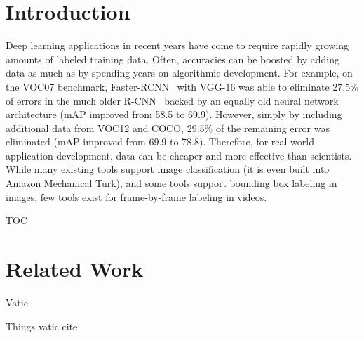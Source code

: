 \section{Introduction}
\label{sec:introduction}

Deep learning applications in recent years have come to require rapidly growing amounts of labeled training data.
Often, accuracies can be boosted by adding data as much as by spending years on algorithmic development.
For example, on the VOC07 benchmark, Faster-RCNN~\cite{FasterRCNN} with VGG-16 was able to eliminate 27.5\% of errors in the much older R-CNN~\cite{RCNN} backed by an equally old neural network architecture (mAP improved from 58.5 to 69.9). 
However, simply by including additional data from VOC12 and COCO, 29.5\% of the remaining error was eliminated (mAP improved from 69.9 to 78.8). 
Therefore, for real-world application development, data can be cheaper and more effective than scientists. 
While many existing tools support image classification (it is even built into Amazon Mechanical Turk), and some tools support bounding box labeling in images, few tools exist for frame-by-frame labeling in videos. 

TOC

\section{Related Work}
\label{sec:policy}

Vatic

Things vatic cite
